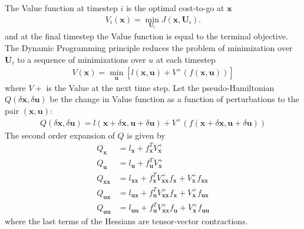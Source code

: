 \documentclass[letterpaper, paper,11pt]{AAS}
\newcommand{\state}{\ensuremath{\mathbf{x}}}
\newcommand{\control}{\ensuremath{\mathbf{u}}}
\newcommand{\Control}{\ensuremath{\mathbf{U}}}
\begin{document}
The Value function at timestep $i$ is the optimal cost-to-go at \state
\begin{align}
V_i(\state) = \min_{\Control_i} J(\state, \Control_i).
\end{align}
and at the final timestep the Value function is equal to the terminal objective. The Dynamic Programming principle reduces the problem of minimization over $\Control_i$ to a sequence of minimizations over $u$ at each timestep 
\begin{align}
V(\state) = \min_{\control}\left[l(\state,\control) + V^+(f(\state,\control))\right] \label{eq_dynamic_programming}
\end{align}
where $V+$ is the Value at the next time step.
Let the pseudo-Hamiltonian $Q(\delta\state,\delta\control)$ be the change in Value function as a function of perturbations to the pair $(\state,\control)$:
\begin{align}
Q(\delta\state,\delta\control) = l(\state+\delta\state,\control+\delta\control) + V^+(f(\state+\delta\state,\control+\delta\control))
\end{align}
The second order expansion of $ Q $ is given by
\begin{align}
Q_\state &= l_\state + f_\state^T V^+_\state \\
Q_\control &= l_\control + f_\control^T V^+_\state \\
Q_{\state\state} &= l_{\state\state} + f_\state^T V^+_{\state\state}f_\state + V^+_\state f_{\state\state} \\
Q_{\control\state} &= l_{\control\state} + f_\control^T V^+_{\state\state}f_\state + V^+_\state f_{\control\state} \\
Q_{\control\control} &= l_{\control\control} + f_\control^T V^+_{\state\state}f_\control + V^+_\state f_{\control\control}
\end{align}
where the last terms of the Hessians are tensor-vector contractions.
\end{document}
